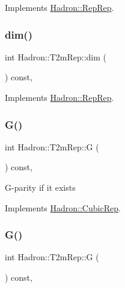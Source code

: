 Implements \mbox{\hyperlink{structHadron_1_1RepRep_a92c8802e5ed7afd7da43ccfd5b7cd92b}{Hadron\+::\+Rep\+Rep}}.

\mbox{\label{structHadron_1_1T2mRep_abd34f4a53af78200eaf2e03661f8af73}} 
\subsubsection{\texorpdfstring{dim()}{dim()}\hspace{0.1cm}{\footnotesize\ttfamily [3/3]}}
{\footnotesize\ttfamily int Hadron\+::\+T2m\+Rep\+::dim (\begin{DoxyParamCaption}{ }\end{DoxyParamCaption}) const\hspace{0.3cm}{\ttfamily [inline]}, {\ttfamily [virtual]}}



Implements \mbox{\hyperlink{structHadron_1_1RepRep_a92c8802e5ed7afd7da43ccfd5b7cd92b}{Hadron\+::\+Rep\+Rep}}.

\mbox{\label{structHadron_1_1T2mRep_a267fc6956970178cd9b265262f9d3c6b}} 
\subsubsection{\texorpdfstring{G()}{G()}\hspace{0.1cm}{\footnotesize\ttfamily [1/2]}}
{\footnotesize\ttfamily int Hadron\+::\+T2m\+Rep\+::G (\begin{DoxyParamCaption}{ }\end{DoxyParamCaption}) const\hspace{0.3cm}{\ttfamily [inline]}, {\ttfamily [virtual]}}

G-\/parity if it exists 

Implements \mbox{\hyperlink{structHadron_1_1CubicRep_a52104e43266d1614c00bbd1c3b395458}{Hadron\+::\+Cubic\+Rep}}.

\mbox{\label{structHadron_1_1T2mRep_a267fc6956970178cd9b265262f9d3c6b}} 
\subsubsection{\texorpdfstring{G()}{G()}\hspace{0.1cm}{\footnotesize\ttfamily [2/2]}}
{\footnotesize\ttfamily int Hadron\+::\+T2m\+Rep\+::G (\begin{DoxyParamCaption}{ }\end{DoxyParamCaption}) const\hspace{0.3cm}{\ttfamily [inline]}, {\ttfamily [virtual]}}


